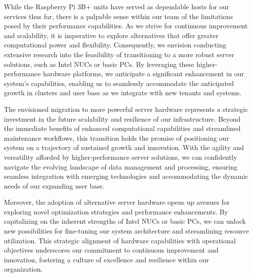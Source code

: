 While the Raspberry Pi 3B+ units have served as dependable hosts for our
services thus far, there is a palpable sense within our team of the limitations
posed by their performance capabilities. As we strive for continuous improvement
and scalability, it is imperative to explore alternatives that offer greater
computational power and flexibility. Consequently, we envision conducting
extensive research into the feasibility of transitioning to a more robust server
solutions, such as Intel NUCs or basic PCs. By leveraging these
higher-performance hardware platforms, we anticipate a significant enhancement
in our system's capabilities, enabling us to seamlessly accommodate the
anticipated growth in clusters and user base as we integrate with new tenants
and systems.

The envisioned migration to more powerful server hardware represents a strategic
investment in the future scalability and resilience of our infrastructure.
Beyond the immediate benefits of enhanced computational capabilities and
streamlined maintenance workflows, this transition holds the promise of
positioning our system on a trajectory of sustained growth and innovation. With
the agility and versatility afforded by higher-performance server solutions, we
can confidently navigate the evolving landscape of data management and
processing, ensuring seamless integration with emerging technologies and
accommodating the dynamic needs of our expanding user base.

Moreover, the adoption of alternative server hardware opens up avenues for
exploring novel optimization strategies and performance enhancements. By
capitalizing on the inherent strengths of Intel NUCs or basic PCs, we can unlock
new possibilities for fine-tuning our system architecture and streamlining
resource utilization. This strategic alignment of hardware capabilities with
operational objectives underscores our commitment to continuous improvement and
innovation, fostering a culture of excellence and resilience within our
organization.